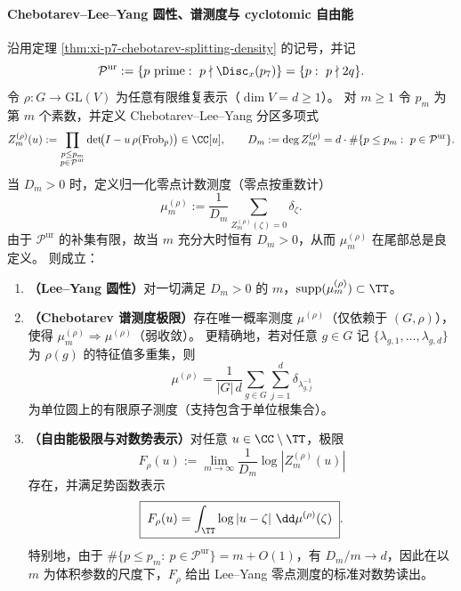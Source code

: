 \paragraph{Chebotarev--Lee--Yang 圆性、谱测度与 cyclotomic 自由能}
\begin{theorem}\label{thm:xi-p7-chebotarev-leyang-circularity-and-limit-law}
沿用定理 \ref{thm:xi-p7-chebotarev-splitting-density} 的记号，并记
\[
\mathcal P^{\mathrm{ur}}:=\{p\ \text{prime}:\ p\nmid \Disc_x(p_7)\}=\{p:\ p\nmid 2q\}.
\]
令 \(\rho:G\to\mathrm{GL}(V)\) 为任意有限维复表示（\(\dim V=d\ge 1\)）。
对 \(m\ge 1\) 令 \(p_m\) 为第 \(m\) 个素数，并定义 Chebotarev--Lee--Yang 分区多项式
\[
Z_m^{(\rho)}(u):=\prod_{\substack{p\le p_m\\ p\in \mathcal P^{\mathrm{ur}}}}\det\!\bigl(I-u\,\rho(\mathrm{Frob}_p)\bigr)\in\CC[u],
\qquad
D_m:=\deg Z_m^{(\rho)}=d\cdot \#\{p\le p_m:\ p\in\mathcal P^{\mathrm{ur}}\}.
\]
当 \(D_m>0\) 时，定义归一化零点计数测度（零点按重数计）
\[
\mu_m^{(\rho)}:=\frac{1}{D_m}\sum_{Z_m^{(\rho)}(\zeta)=0}\delta_\zeta.
\]
由于 \(\mathcal P^{\mathrm{ur}}\) 的补集有限，故当 \(m\) 充分大时恒有 \(D_m>0\)，从而 \(\mu_m^{(\rho)}\) 在尾部总是良定义。
则成立：
\begin{enumerate}
  \item \textbf{（Lee--Yang 圆性）}对一切满足 \(D_m>0\) 的 \(m\)，\(\mathrm{supp}(\mu_m^{(\rho)})\subset \TT\)。
  \item \textbf{（Chebotarev 谱测度极限）}存在唯一概率测度 \(\mu^{(\rho)}\)（仅依赖于 \((G,\rho)\)），使得 \(\mu_m^{(\rho)}\Rightarrow \mu^{(\rho)}\)（弱收敛）。
  更精确地，若对任意 \(g\in G\) 记 \(\{\lambda_{g,1},\dots,\lambda_{g,d}\}\) 为 \(\rho(g)\) 的特征值多重集，则
  \[
  \boxed{\;
  \mu^{(\rho)}=\frac{1}{|G|\,d}\sum_{g\in G}\sum_{j=1}^{d}\delta_{\lambda_{g,j}^{-1}}\;}
  \]
  为单位圆上的有限原子测度（支持包含于单位根集合）。
  \item \textbf{（自由能极限与对数势表示）}对任意 \(u\in\CC\setminus \TT\)，极限
  \[
  F_\rho(u):=\lim_{m\to\infty}\frac{1}{D_m}\log|Z_m^{(\rho)}(u)|
  \]
  存在，并满足势函数表示
  \[
  \boxed{\;
  F_\rho(u)=\int_{\TT}\log|u-\zeta|\ \dd\mu^{(\rho)}(\zeta)\; }.
  \]
  特别地，由于 \(\#\{p\le p_m:\ p\in\mathcal P^{\mathrm{ur}}\}=m+O(1)\)，有 \(D_m/m\to d\)，因此在以 \(m\) 为体积参数的尺度下，\(F_\rho\) 给出 Lee--Yang 零点测度的标准对数势读出。
\end{enumerate}
\end{theorem}
